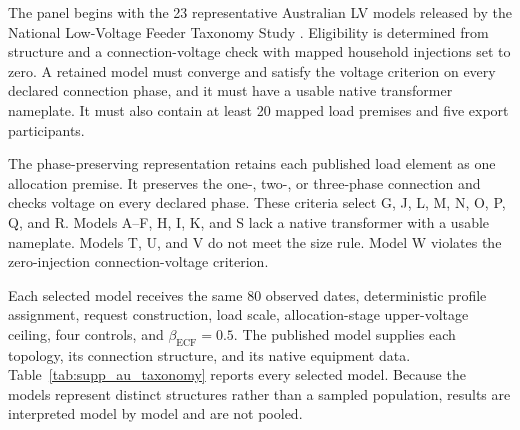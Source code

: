 \documentclass[11pt]{article}
\begin{document}
The panel begins with the 23 representative Australian LV models released by
the National Low-Voltage Feeder Taxonomy Study
\cite{geth2021lvtaxonomy}. Eligibility is determined from structure and a
connection-voltage check with mapped household injections set to zero. A retained
model must converge and satisfy the voltage criterion on every declared
connection phase, and it must have a usable native transformer nameplate. It
must also contain at least 20 mapped load premises and five export participants.

The phase-preserving representation retains each published load element as one
allocation premise. It preserves the one-, two-, or three-phase connection and
checks voltage on every declared phase. These criteria select G, J, L, M, N, O,
P, Q, and R. Models A--F, H, I, K, and S lack a native transformer with a
usable nameplate. Models T, U, and V do not meet the size rule. Model W violates
the zero-injection connection-voltage criterion.

Each selected model receives the same 80 observed dates, deterministic profile
assignment, request construction, load scale, allocation-stage upper-voltage ceiling, four
controls, and $\beta_{\mathrm{ECF}}=0.5$. The published model supplies each topology, its connection structure, and
its native equipment data. Table~\ref{tab:supp_au_taxonomy} reports every selected
model. Because the models represent distinct structures rather than a sampled
population, results are interpreted model by model and are not pooled.
\end{document}
